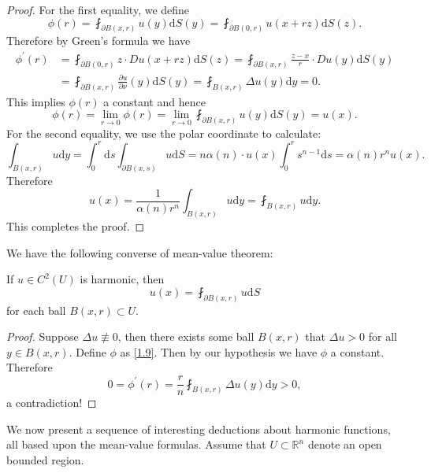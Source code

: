 \begin{proof}
For the first equality, we define 
\begin{equation}\label{1.9}
\phi \left( r \right) =\fint_{\partial B\left( x,r \right)}{u\left( y \right) \mathrm{d}S\left( y \right)}=\fint_{\partial B\left( 0,r \right)}{u\left( x+rz \right) \mathrm{d}S\left( z \right)}.
\end{equation}
Therefore by Green's formula we have 
$$
\begin{aligned}
\phi ^{\prime}\left( r \right) &=\fint_{\partial B\left( 0,r \right)}{z\cdot Du\left( x+rz \right) \mathrm{d}S\left( z \right)}=\fint_{\partial B\left( x,r \right)}{\frac{z-x}{r}\cdot Du\left( y \right) \mathrm{d}S\left( y \right)}
\\
&=\fint_{\partial B\left( x,r \right)}{\frac{\partial u}{\partial \nu}\left( y \right) \mathrm{d}S\left( y \right)}=\fint_{B\left( x,r \right)}{\Delta u\left( y \right) \mathrm{d}y}=0.
\end{aligned}
$$
This implies $\phi(r)$ a constant and hence 
$$
\phi \left( r \right) =\lim_{r\rightarrow 0} \phi \left( r \right) =\lim_{r\rightarrow 0} \fint_{\partial B\left( x,r \right)}{u\left( y \right) \mathrm{d}S\left( y \right)}=u\left( x \right) .
$$
For the second equality, we use the polar coordinate to calculate: 
$$
\int_{B\left( x,r \right)}{u\mathrm{d}y}=\int_0^r{\mathrm{d}s\int_{\partial B\left( x,s \right)}{u\mathrm{d}S}}=n\alpha \left( n \right) \cdot u\left( x \right) \int_0^r{s^{n-1}\mathrm{d}s}=\alpha \left( n \right) r^nu\left( x \right) .
$$
Therefore 
$$
u\left( x \right) =\frac{1}{\alpha \left( n \right) r^n}\int_{B\left( x,r \right)}{u\mathrm{d}y}=\fint_{B\left( x,r \right)}{u\mathrm{d}y}.
$$
This completes the proof.
\end{proof}
We have the following converse of mean-value theorem: 
\begin{theorem}
If $u\in C^2(U)$ is harmonic, then 
$$
u\left( x \right) =\fint_{\partial B\left( x,r \right)}{u\mathrm{d}S}
$$
for each ball $B(x,r)\subset U$.
\end{theorem}
\begin{proof}
Suppose $\Delta u\not\equiv 0$, then there exists some ball $B(x,r)$ that $\Delta u>0$ for all $y\in B(x,r)$. Define $\phi$ as \eqref{1.9}. Then by our hypothesis we have $\phi$ a constant. Therefore 
$$
0=\phi ^{\prime}\left( r \right) =\frac{r}{n}\fint_{B\left( x,r \right)}{\Delta u\left( y \right) \mathrm{d}y}>0,
$$
a contradiction!
\end{proof}
We now present a sequence of interesting deductions about harmonic functions, all based upon the mean-value formulas. Assume that $U\subset\mathbb{R}^n$ denote an open bounded region.\par
